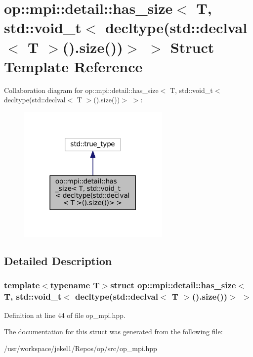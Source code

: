 \hypertarget{structop_1_1mpi_1_1detail_1_1has__size_3_01T_00_01std_1_1void__t_3_01decltype_07std_1_1declval_336d4e0461dc0efc09f20739ab7700530}{\section{op\-:\-:mpi\-:\-:detail\-:\-:has\-\_\-size$<$ T, std\-:\-:void\-\_\-t$<$ decltype(std\-:\-:declval$<$ T $>$().size())$>$ $>$ Struct Template Reference}
\label{structop_1_1mpi_1_1detail_1_1has__size_3_01T_00_01std_1_1void__t_3_01decltype_07std_1_1declval_336d4e0461dc0efc09f20739ab7700530}
}


Collaboration diagram for op\-:\-:mpi\-:\-:detail\-:\-:has\-\_\-size$<$ T, std\-:\-:void\-\_\-t$<$ decltype(std\-:\-:declval$<$ T $>$().size())$>$ $>$\-:
\nopagebreak
\begin{figure}[H]
\begin{center}
\leavevmode
\includegraphics[width=210pt]{structop_1_1mpi_1_1detail_1_1has__size_3_01T_00_01std_1_1void__t_3_01decltype_07std_1_1declval_3b207867be39348695172c74d7e29575d}
\end{center}
\end{figure}


\subsection{Detailed Description}
\subsubsection*{template$<$typename T$>$struct op\-::mpi\-::detail\-::has\-\_\-size$<$ T, std\-::void\-\_\-t$<$ decltype(std\-::declval$<$ T $>$().\-size())$>$ $>$}



Definition at line 44 of file op\-\_\-mpi.\-hpp.



The documentation for this struct was generated from the following file\-:\begin{DoxyCompactItemize}
\item 
/usr/workspace/jekel1/\-Repos/op/src/op\-\_\-mpi.\-hpp\end{DoxyCompactItemize}
